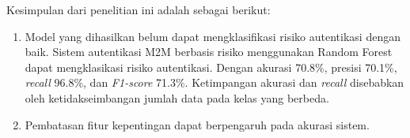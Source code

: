 Kesimpulan dari penelitian ini adalah sebagai berikut:
\begin{enumerate}
	\item Model yang dihasilkan belum dapat mengklasifikasi risiko autentikasi dengan baik. Sistem autentikasi M2M berbasis risiko menggunakan Random Forest dapat mengklasikasi risiko autentikasi. Dengan akurasi 70.8\%, presisi 70.1\%, \textit{recall} 96.8\%, dan \textit{F1-score} 71.3\%. Ketimpangan akurasi dan \textit{recall} disebabkan oleh ketidakseimbangan jumlah data pada kelas yang berbeda.
	\item Pembatasan fitur kepentingan dapat berpengaruh pada akurasi sistem.
\end{enumerate}
